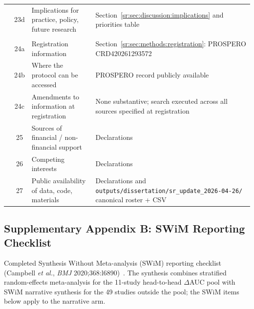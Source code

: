 \begin{longtable}{@{}p{1.6cm}cp{4.6cm}p{7.4cm}@{}}
         & 23d & Implications for practice, policy, future research & Section~\ref{sr:sec:discussion:implications} and priorities table \\
\addlinespace
\multicolumn{4}{@{}l}{\textbf{OTHER INFORMATION}} \\
         & 24a & Registration information & Section~\ref{sr:sec:methods:registration}: PROSPERO CRD420261293572 \\
         & 24b & Where the protocol can be accessed & PROSPERO record publicly available \\
         & 24c & Amendments to information at registration & None substantive; search executed across all sources specified at registration \\
         & 25 & Sources of financial / non-financial support & Declarations \\
         & 26 & Competing interests & Declarations \\
         & 27 & Public availability of data, code, materials & Declarations and \texttt{outputs/dissertation/sr\_update\_2026-04-26/} canonical roster + CSV \\
\end{longtable}
\normalsize

\subsection*{Supplementary Appendix B: SWiM Reporting Checklist}
\label{sr:sec:supp:swim}

\noindent Completed Synthesis Without Meta-analysis (SWiM) reporting checklist (Campbell \textit{et al.}, \textit{BMJ} 2020;368:l6890)~\cite{campbell2020}. The synthesis combines stratified random-effects meta-analysis for the 11-study head-to-head $\Delta$AUC pool with SWiM narrative synthesis for the 49 studies outside the pool; the SWiM items below apply to the narrative arm.

